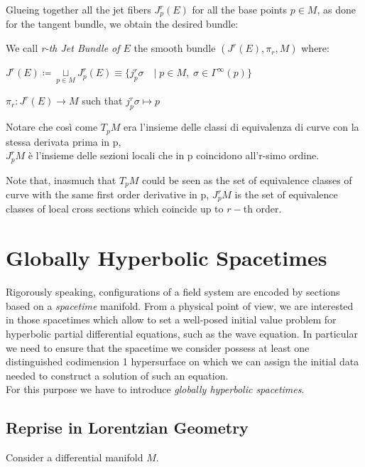 \documentclass[Main]{subfiles}
\begin{document}
		Glueing together all the jet fibers $J^r_p (E)$ for all the base points $p\in M$, as done for the tangent bundle,  we obtain the desired bundle:
		\begin{definition}
			We call \emph{r-th Jet Bundle of $E$} the smooth bundle $(J^r(E), \pi_r, M)$	where:
			\begin{compactitemize}
				\item $J^r(E) \coloneqq \underset{p \in M}{\sqcup} J^r_p (E)
					 \equiv \big\{j^r_p\sigma \quad \vert \; p\in M, \; \sigma \in \Gamma^\infty(p) \big\}$
				\item $\pi_r: J^r(E) \rightarrow M$ such that $j^{r}_{p}\sigma \mapsto p $
			\end{compactitemize}
		\end{definition}
		
	\ifToninus
	Notare che così come $T_pM$ era l'insieme delle classi di equivalenza di curve con la stessa derivata prima in p,\\
	$J_p^rM$ è l'insieme delle sezioni locali che in p coincidono all'r-simo ordine.	
	\fi

	Note that, inasmuch that $T_pM$  could be seen as the set of equivalence classes of curve with the same first order derivative in p,
	$J_p^rM$ is the set of equivalence classes of local cross sections which coincide up to $r-$th order.

	\section{Globally Hyperbolic Spacetimes}
		Rigorously speaking, configurations of a field system are encoded by sections based on a \emph{spacetime} manifold.
		From a physical point of view, we are interested in those spacetimes which allow to set a well-posed initial value problem for hyperbolic partial differential equations, such as the wave equation.
		 In particular we need to ensure that the spacetime we consider possess at least one distinguished codimension 1 hypersurface on which we can assign the initial data needed to construct a solution of such an equation.
	 	\\
	 	For this purpose we have to  introduce \emph{globally hyperbolic spacetimes}.

		\subsection{Reprise in Lorentzian Geometry}
			Consider a differential manifold $M$.
\end{document}
